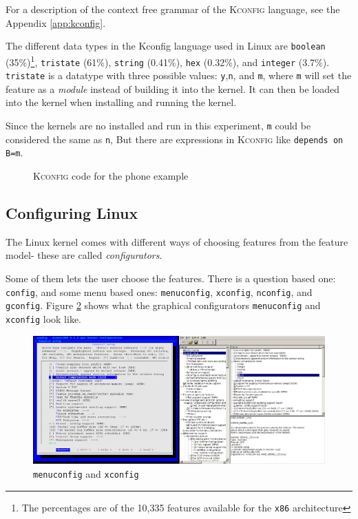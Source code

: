 \documentclass[a4paper,11pt]{report}
\newcommand{\f}{\footnote{\fn}}
\newcommand{\textcode}[1]{\fboxsep=1pt\texttt{\colorbox{gray!20}{#1}}}
\newcommand{\figa}{
    \begin{figure}[!htpb]
    \centering
}
\newcommand{\figb}[2]{
    \caption{#1}
    \label{#2}
    \end{figure}
}
\begin{document}
For a description of the context free grammar of 
the \textsc{Kconfig} language, see the Appendix \ref{app:kconfig}.
\\

            \def \fn {The percentages are of the 10,335 features available for 
                the \texttt{x86} architecture}

The different data types in the Kconfig language used in Linux are 
\textcode{boolean} (35\%)\f, 
\textcode{tristate} (61\%), \textcode{string} (0.41\%), \textcode{hex} 
(0.32\%), and \textcode{integer} (3.7\%). \texttt{tristate} is a datatype 
with three possible values: \texttt{y},\texttt{n}, and \texttt{m}, where 
\texttt{m} will set the feature as a \emph{module} instead of building it into the 
kernel. It can then be loaded into the kernel when installing and running the 
kernel.

Since the kernels are no installed and run in this experiment, \texttt{m} could be considered the same as \texttt{n}, But there are 
expressions in \textsc{Kconfig} like \textcode{depends on B=m}. 



\figa
    \subfigure{
        
    }
\figb{\textsc{Kconfig} code for the phone example}{kconfigphone}

            \subsection{Configuring Linux}
            \label{sec:conf}

The Linux kernel comes with different ways of choosing features from the feature model- these are 
called \emph{configurators}. 

Some of them lets the user choose the features. There is a question based 
one: \texttt{config}, and some menu based ones: \texttt{menuconfig}, 
\texttt{xconfig}, \texttt{nconfig}, and \texttt{gconfig}.  Figure \ref{fig:lineofconfigs} shows what the graphical 
configurators \texttt{menuconfig} and 
\texttt{xconfig} look like.
\\


\figa
    \includegraphics[scale=0.25]{pngs/2configs.png}
\figb{\texttt{menuconfig} and \texttt{xconfig}}{fig:lineofconfigs}
\end{document}
